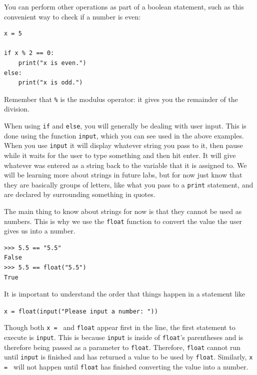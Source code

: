 \documentclass[11pt,hidelinks]{article}
\begin{document}
You can perform other operations as part of a boolean statement, such as this convenient way to check if a number is even:

\begin{lstlisting}[style=python]
x = 5

if x % 2 == 0:
    print("x is even.")
else:
    print("x is odd.")
\end{lstlisting}

Remember that \lstinline!%! 
is the modulus operator: it gives you the remainder of the division.

When using \lstinline{if} and \lstinline{else}, you will generally be dealing
with user input. This is done using the function \lstinline{input}, which you
can see used in the above examples. When you use \lstinline{input} it will
display whatever string you pass to it, then pause while it waits for the user
to type something and then hit enter. It will give whatever was entered as a
string back to the variable that it is assigned to. We will be learning more
about strings in future labs, but for now just know that they are basically
groups of letters, like what you pass to a \lstinline{print} statement, and are
declared by surrounding something in quotes.

The main thing to know about strings for now is that they cannot be used as
numbers. This is why we use the \lstinline{float} function to convert the value
the user gives us into a number.

\begin{lstlisting}[style=ipython]
>>> 5.5 == "5.5"
False
>>> 5.5 == float("5.5")
True
\end{lstlisting}

It is important to understand the order that things happen in a statement like

\lstinline{x = float(input("Please input a number: "))}

Though both \lstinline{x = } and \lstinline{float} appear first in the line, the
first statement to execute is \lstinline{input}. This is because
\lstinline{input} is inside of \lstinline{float}'s parentheses and is therefore
being passed as a parameter to \lstinline{float}. Therefore, \lstinline{float}
cannot run until \lstinline{input} is finished and has returned a value to be
used by \lstinline{float}. Similarly, \lstinline{x = } will not happen until
\lstinline{float} has finished converting the value into a number.
\end{document}
